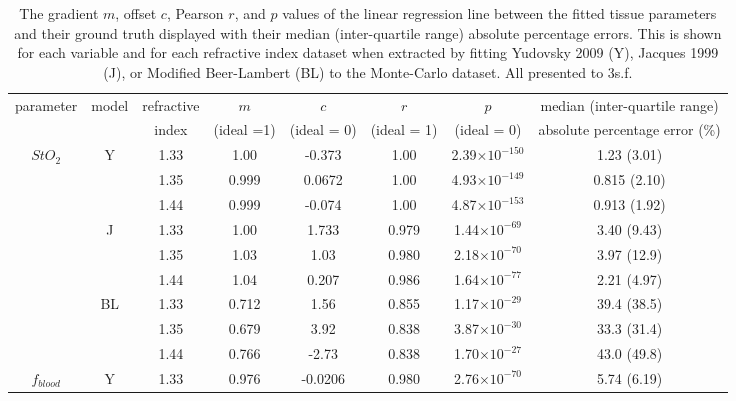 \begin{table}[htb!]
    \centering
    \caption{The gradient $m$, offset $c$, Pearson $r$, and $p$ values of the linear regression line between the fitted tissue parameters and their ground truth displayed with their median (inter-quartile range) absolute percentage errors. This is shown for each variable and for each refractive index dataset when extracted by fitting Yudovsky 2009 (Y), Jacques 1999 (J), or Modified Beer-Lambert (BL) to the Monte-Carlo dataset. All presented to 3s.f.}
    \begin{tabular}{|ccc|ccccc|}
        \hline
        parameter & model & refractive & $m$ & $c$ & $r$ & $p$ & median (inter-quartile range) \\
        & & index & (ideal =1) & (ideal = 0) & (ideal = 1) & (ideal = 0) & absolute percentage error (\%)\\
        \hline
        \multirow{9}{*}{$StO_2$} & \multirow{3}{*}{Y} & 1.33 & 1.00 & -0.373 & 1.00 & 2.39$\times 10^{-150}$ & 1.23 (3.01) \\
        & & 1.35 & 0.999 & 0.0672 & 1.00 & 4.93$\times 10^{-149}$ & 0.815 (2.10) \\
        & & 1.44 & 0.999 & -0.074 & 1.00 & 4.87$\times 10^{-153}$ & 0.913 (1.92) \\
        \cline{2-8}
        & \multirow{3}{*}{J} & 1.33 & 1.00 & 1.733 & 0.979 & 1.44$\times 10^{-69}$ & 3.40 (9.43) \\
        & & 1.35 & 1.03 & 1.03 & 0.980 & 2.18$\times 10^{-70}$ & 3.97 (12.9) \\
        & & 1.44 &  1.04 & 0.207 & 0.986 & 1.64$\times 10^{-77}$ & 2.21 (4.97) \\
        \cline{2-8}
        & \multirow{3}{*}{BL} & 1.33 & 0.712 & 1.56 & 0.855 & 1.17$\times 10^{-29}$ & 39.4 (38.5) \\
        & & 1.35 & 0.679 & 3.92 & 0.838 & 3.87$\times 10^{-30}$ & 33.3 (31.4) \\
        & & 1.44 & 0.766 & -2.73 & 0.838 & 1.70$\times 10^{-27}$ & 43.0 (49.8) \\
        \hline
        \multirow{9}{*}{$f_{blood}$} & \multirow{3}{*}{Y} & 1.33 & 0.976 & -0.0206 & 0.980 & 2.76$\times 10^{-70}$ & 5.74 (6.19) \\

\end{tabular}
\end{table}
